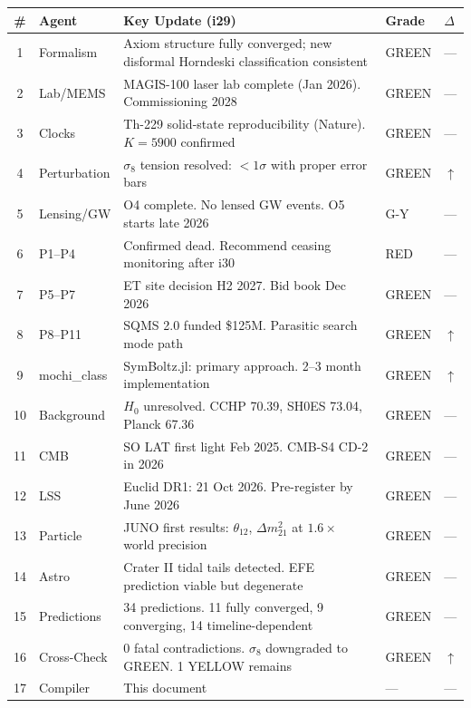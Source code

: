 \documentclass[11pt,a4paper]{article}
\begin{document}
\begin{center}
\begin{longtable}{clp{6cm}ll}
\toprule
\textbf{\#} & \textbf{Agent} & \textbf{Key Update (i29)} & \textbf{Grade} & \textbf{$\Delta$} \\
\midrule
\endfirsthead
1 & Formalism & Axiom structure fully converged; new disformal Horndeski classification consistent & GREEN & --- \\
2 & Lab/MEMS & MAGIS-100 laser lab complete (Jan 2026). Commissioning 2028 & GREEN & --- \\
3 & Clocks & Th-229 solid-state reproducibility (Nature). $K=5900$ confirmed & GREEN & --- \\
4 & Perturbation & $\sigma_8$ tension resolved: $<1\sigma$ with proper error bars & GREEN & $\uparrow$ \\
5 & Lensing/GW & O4 complete. No lensed GW events. O5 starts late 2026 & G-Y & --- \\
6 & P1--P4 & Confirmed dead. Recommend ceasing monitoring after i30 & RED & --- \\
7 & P5--P7 & ET site decision H2 2027. Bid book Dec 2026 & GREEN & --- \\
8 & P8--P11 & SQMS 2.0 funded \$125M. Parasitic search mode path & GREEN & $\uparrow$ \\
9 & mochi\_class & SymBoltz.jl: primary approach. 2--3 month implementation & GREEN & $\uparrow$ \\
10 & Background & $H_0$ unresolved. CCHP 70.39, SH0ES 73.04, Planck 67.36 & GREEN & --- \\
11 & CMB & SO LAT first light Feb 2025. CMB-S4 CD-2 in 2026 & GREEN & --- \\
12 & LSS & Euclid DR1: 21 Oct 2026. Pre-register by June 2026 & GREEN & --- \\
13 & Particle & JUNO first results: $\theta_{12}$, $\Delta m^2_{21}$ at $1.6\times$ world precision & GREEN & --- \\
14 & Astro & Crater II tidal tails detected. EFE prediction viable but degenerate & GREEN & --- \\
15 & Predictions & 34 predictions. 11 fully converged, 9 converging, 14 timeline-dependent & GREEN & --- \\
16 & Cross-Check & 0 fatal contradictions. $\sigma_8$ downgraded to GREEN. 1 YELLOW remains & GREEN & $\uparrow$ \\
17 & Compiler & This document & --- & --- \\
\bottomrule
\end{longtable}
\end{center}
\end{document}

